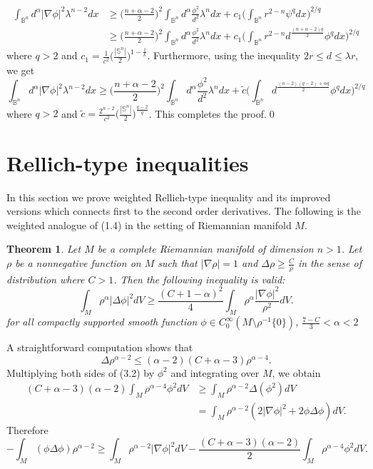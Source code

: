 \documentclass[12pt]{amsart}
\numberwithin{equation}{section}
\newtheorem{theorem}{Theorem}
\numberwithin{theorem}{section}
\numberwithin{theorem}{section} \numberwithin{lemma}{section}
\numberwithin{definition}{section}
\numberwithin{corollary}{section}
\numberwithin{remark}{section}
\numberwithin{proposition}{section}
\begin{document}
\[\begin{aligned}
\int_{\mathbb{B}^n}d^{\alpha}|\nabla\phi|^2\lambda^{n-2}dx
&\ge\Big(\frac{n+\alpha-2}{2}\Big)^2\int_{\mathbb{B}^n}
d^{\alpha}\frac{\phi^2}{d^2}\lambda^ndx+ c_1\Big(\int_{
\mathbb{B}^n} r^{2-n}\psi^qdx\Big)^{2/q}\\
&\ge \Big(\frac{n+\alpha-2}{2}\Big)^2\int_{\mathbb{B}^n}
d^{\alpha}\frac{\phi^2}{d^2}\lambda^ndx+c_1\Big(\int_{ \mathbb{B}^n}
r^{2-n}d^{\frac{(n+\alpha-2)q}{2}}\phi^qdx\Big)^{2/q}\end{aligned}\]
where $q>2$ and
$c_1=\frac{1}{c^2}\big(\frac{|\mathbb{S}^n|}{2}\big)^{1-\frac{1}{k}}$.
Furthermore,  using the inequality $2r\le d\le \lambda r$, we get
\[\int_{\mathbb{B}^n}d^{\alpha}|\nabla\phi|^2\lambda^{n-2}dx\ge\Big(\frac{n+\alpha-2}{2}\Big)^2\int_{\mathbb{B}^n}
d^{\alpha}\frac{\phi^2}{d^2}\lambda^ndx+ \tilde{c}\Big(\int_{
\mathbb{B}^n} d^{\frac{(n-2)(q-2)+\alpha q}{2}}\phi^qdx\Big)^{2/q}\]
where $q>2$ and $\tilde{c}=
\frac{2^{n-2}}{c^2}\big(\frac{|\mathbb{S}^n|}{2}\big)^{\frac{q-2}{q}}
$.  This completes the proof.\qed

\section{Rellich-type inequalities}
In this section we prove weighted Rellich-type inequality and its
improved versions which connects first to the second order
derivatives. The following is the weighted analogue of (1.4) in the
setting of Riemannian manifold $M$.
\begin{theorem} Let $M$ be a complete  Riemannian manifold of dimension
$n>1$. Let $\rho$ be a nonnegative function on $M$ such that
$|\nabla \rho|=1$ and  $\Delta\rho\ge \frac{C}{\rho}$ in the sense
of distribution where $ C>1$. Then the following inequality is
valid:
\begin{equation}
\int_{M}\rho^{\alpha}|\Delta\phi|^2dV \ge \frac{(C+1-\alpha)^2}{4}
\int_{M}\rho^{\alpha}\frac{|\nabla\phi|^2}{\rho^{2}}dV.
\end{equation}
for all compactly supported smooth function $\phi\in
C_0^{\infty}(M\setminus\rho^{-1}\{0\})$, $\frac{7-C}{3}<\alpha<2$
\end{theorem}
\proof A straightforward computation shows that
\begin{equation}\Delta \rho^{\alpha-2}\le(\alpha-2)(C+\alpha-3)\rho^{\alpha-4}.\end{equation}
Multiplying both sides of (3.2) by $\phi^2$ and integrating over
$M$,  we obtain
\begin{equation}\begin{aligned}(C+\alpha-3)(\alpha-2)\int_M \rho^{\alpha-4}\phi^2dV &\ge \int_M \rho^{\alpha-2}
\Delta(\phi^2)dV\\& = \int_M
\rho^{\alpha-2}(2|\nabla\phi|^2+2\phi\Delta\phi)dV.
\end{aligned}
\end{equation}
Therefore
\begin{equation}-\int_M(\phi\Delta\phi)\rho^{\alpha-2}\ge \int_M
\rho^{\alpha-2}|\nabla\phi|^2dV-\frac{(C+\alpha-3)(\alpha-2)}{2}\int_M
\rho^{\alpha-4}\phi^2dV.\end{equation}
\end{document}
